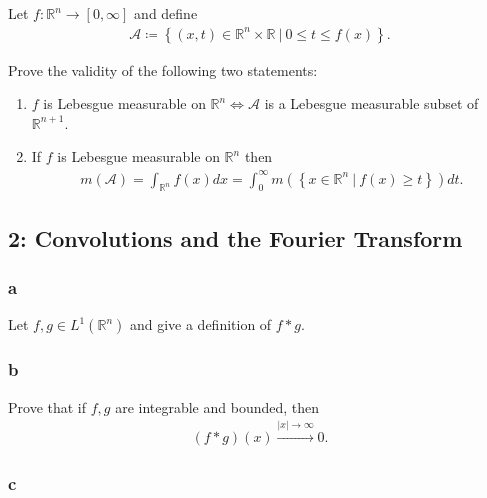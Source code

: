 Let \(f:{\mathbb{R}}^n\to [0, \infty]\) and define
\begin{align*} {\mathcal{A}}\coloneqq\left\{{(x, t) \in {\mathbb{R}}^n\times{\mathbb{R}}{~\mathrel{\Big|}~}0\leq t \leq f(x)}\right\} .\end{align*}

Prove the validity of the following two statements:

\begin{enumerate}
\def\labelenumi{\arabic{enumi}.}
\tightlist
\item
  \(f\) is Lebesgue measurable on
  \({\mathbb{R}}^{n} \iff {\mathcal{A}}\) is a Lebesgue measurable
  subset of \({\mathbb{R}}^{n+1}\).
\item
  If \(f\) is Lebesgue measurable on \({\mathbb{R}}^n\) then
  \begin{align*}     m(\mathcal{A})=\int_{\mathbb{R}^{n}} f(x) d x=\int_{0}^{\infty} m\left(\left\{x \in \mathbb{R}^{n}{~\mathrel{\Big|}~}f(x) \geq t\right\}\right) d t     .\end{align*}
\end{enumerate}

\hypertarget{convolutions-and-the-fourier-transform}{%
\subsection{2: Convolutions and the Fourier
Transform}\label{convolutions-and-the-fourier-transform}}

\hypertarget{a-1}{%
\subsubsection{a}\label{a-1}}

Let \(f, g\in L^1({\mathbb{R}}^n)\) and give a definition of
\(f\ast g\).

\hypertarget{b-1}{%
\subsubsection{b}\label{b-1}}

Prove that if \(f, g\) are integrable and bounded, then
\begin{align*} (f\ast g)(x) \overset{{\left\lvert {x} \right\rvert}\to\infty}\to 0 .\end{align*}

\hypertarget{c}{%
\subsubsection{c}\label{c}}

